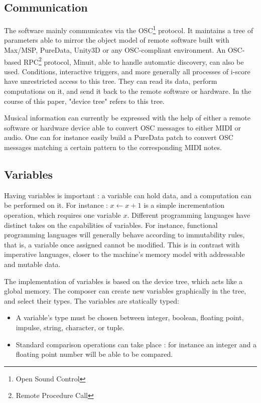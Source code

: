 \documentclass{article}
\begin{document}
\subsection{Communication}
The software mainly communicates via the OSC\footnote{Open Sound Control} protocol.
It maintains a tree of parameters able to mirror 
the object model of remote software built with Max/MSP, PureData, Unity3D or any OSC-compliant environment. 
An OSC-based RPC\footnote{Remote Procedure Call} protocol, Minuit, able to handle automatic discovery, can also be used. 
Conditions, interactive triggers, and more generally all processes of i-score have unrestricted 
access to this tree.
They can read its data, perform computations on it, and send it back to the remote software or hardware.
In the course of this paper, "device tree" refers to this tree.

Musical information can currently be expressed with the help of either a remote software or hardware device able 
to convert OSC messages to either MIDI or audio.
One can for instance easily build a PureData patch to convert OSC messages matching a certain pattern 
to the corresponding MIDI notes.

\subsection{Variables}
Having variables is important : a variable can hold data, 
and a computation can be performed on it.
For instance : $x \leftarrow x + 1$ is a simple incrementation 
operation, which requires one variable $x$.
Different programming languages have distinct takes on the 
capabilities of variables.
For instance, functional programming languages will generally 
behave according to immutability rules, that is, a variable once 
assigned cannot be modified.
This is in contrast with imperative languages, closer 
to the machine's memory model with addressable and mutable data.

The implementation of variables is based on the device tree, which 
acts like a global memory. 
The composer can create new variables graphically in the tree, and select their types.
The variables are statically typed: 
\begin{itemize}
    \item A variable's type must be chosen between integer, boolean, floating point, impulse, string, character, or tuple.
    \item Standard comparison operations can take place : for instance an integer and a floating point number will be able to be compared.
\end{itemize} 
\end{document}
